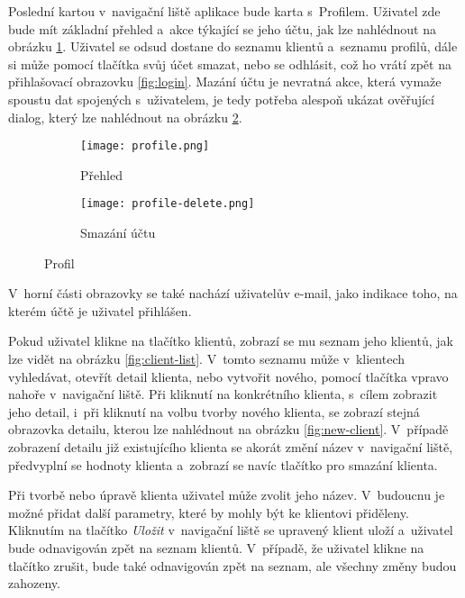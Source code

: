 Poslední kartou v~navigační liště aplikace bude karta s~Profilem. Uživatel zde bude mít základní přehled a~akce týkající se jeho účtu, jak lze nahlédnout na obrázku \ref{fig:profile-overview}. Uživatel se odsud dostane do seznamu klientů a~seznamu profilů, dále si může pomocí tlačítka svůj účet smazat, nebo se odhlásit, což ho vrátí zpět na přihlašovací obrazovku \ref{fig:login}. Mazání účtu je nevratná akce, která vymaže spoustu dat spojených s~uživatelem, je tedy potřeba alespoň ukázat ověřující dialog, který lze nahlédnout na obrázku \ref{fig:profile-delete}. 

\begin{figure}[h]
    \centering
    \begin{subfigure}[b]{0.4\textwidth}
		\centering
		\texttt{[image: profile.png]}
		\caption{Přehled}
		\label{fig:profile-overview}
	\end{subfigure}
	\hspace{2cm}
	\begin{subfigure}[b]{0.4\textwidth}
		\centering
		\texttt{[image: profile-delete.png]}
		\caption{Smazání účtu}
		\label{fig:profile-delete}
	\end{subfigure}
	\caption{Profil}
	\label{fig:profile}
\end{figure}

V~horní části obrazovky se také nachází uživatelův e-mail, jako indikace toho, na kterém účtě je uživatel přihlášen.

Pokud uživatel klikne na tlačítko klientů, zobrazí se mu seznam jeho klientů, jak lze vidět na obrázku \ref{fig:client-list}. V~tomto seznamu může v~klientech vyhledávat, otevřít detail klienta, nebo vytvořit nového, pomocí tlačítka vpravo nahoře v~navigační liště. Při kliknutí na konkrétního klienta, s~cílem zobrazit jeho detail, i~při kliknutí na volbu tvorby nového klienta, se zobrazí stejná obrazovka detailu, kterou lze nahlédnout na obrázku \ref{fig:new-client}. V~případě zobrazení detailu již existujícího klienta se akorát změní název v~navigační liště, předvyplní se hodnoty klienta a~zobrazí se navíc tlačítko pro smazání klienta.

Při tvorbě nebo úpravě klienta uživatel může zvolit jeho název. V~budoucnu je možné přidat další parametry, které by mohly být ke klientovi přiděleny. Kliknutím na tlačítko \emph{Uložit} v~navigační liště se upravený klient uloží a~uživatel bude odnavigován zpět na seznam klientů. V~případě, že uživatel klikne na tlačítko zrušit, bude také odnavigován zpět na seznam, ale všechny změny budou zahozeny.

